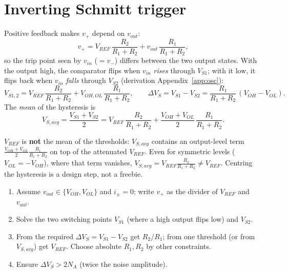 \documentclass[11pt,a4paper,oneside]{book}
\begin{document}
\section{Inverting Schmitt trigger}\label{sec:invschmitt}
Positive feedback makes $v_+$ depend on $v_{out}$:
\[
  v_+=V_{REF}\,\frac{R_2}{R_1+R_2}+v_{out}\,\frac{R_1}{R_1+R_2},
\]
so the trip point seen by $v_{in}$ ($=v_-$) differs between the two output
states. With the output high, the comparator flips when $v_{in}$ \emph{rises}
through $V_{S1}$; with it low, it flips back when $v_{in}$ \emph{falls} through
$V_{S2}$ (derivation Appendix~\ref{app:osc}):
\[
  V_{S1,2}=V_{REF}\,\frac{R_2}{R_1+R_2}+V_{OH,OL}\,\frac{R_1}{R_1+R_2},\qquad
  \Delta V_S=V_{S1}-V_{S2}=\frac{R_1}{R_1+R_2}\,(V_{OH}-V_{OL}).
\]
The \emph{mean} of the hysteresis is
\[
  V_{S,avg}=\frac{V_{S1}+V_{S2}}{2}
   =V_{REF}\,\frac{R_2}{R_1+R_2}+\frac{V_{OH}+V_{OL}}{2}\,\frac{R_1}{R_1+R_2}.
\]

\begin{warning}
$V_{REF}$ is \textbf{not} the mean of the thresholds: $V_{S,avg}$ contains an
output-level term $\frac{V_{OH}+V_{OL}}2\frac{R_1}{R_1+R_2}$ on top of the
attenuated $V_{REF}$. Even for symmetric levels ($V_{OL}=-V_{OH}$), where that
term vanishes, $V_{S,avg}=V_{REF}\frac{R_2}{R_1+R_2}\neq V_{REF}$. Centring
the hysteresis is a design step, not a freebie.
\end{warning}

\begin{protocol}
\begin{enumerate}[leftmargin=1.5cm]
  \item Assume $v_{out}\in\{V_{OH},V_{OL}\}$ and $i_\pm=0$; write $v_+$ as the
        divider of $V_{REF}$ and $v_{out}$.
  \item Solve the two switching points $V_{S1}$ (where a high output flips low)
        and $V_{S2}$.
  \item From the required $\Delta V_S=V_{S1}-V_{S2}$ get $R_2/R_1$; from one
        threshold (or from $V_{S,avg}$) get $V_{REF}$. Choose absolute
        $R_1,R_2$ by other constraints.
  \item Ensure $\Delta V_S>2N_A$ (twice the noise amplitude).
  \end{enumerate}
\end{protocol}
\end{document}
